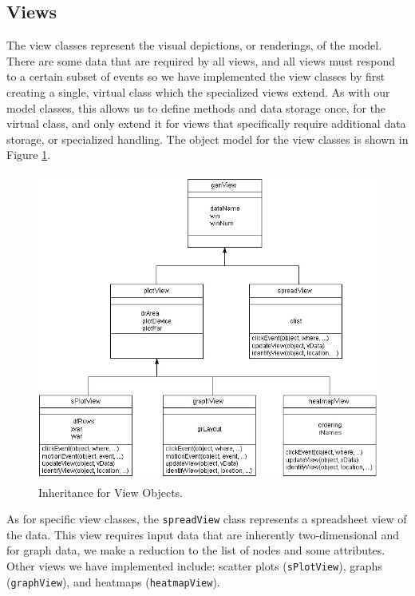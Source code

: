 \documentclass[11pt]{article}
\newcommand{\Rclass}[1]{\texttt{#1}}
\begin{document}
\subsection{Views}\label{Ssec:OneViews}

The view classes represent the visual depictions, or renderings, of
the model.  There are some data that are required by all views, and all views
must respond to a certain subset of events so we have implemented the view
classes by first creating a single, virtual class which the specialized
views extend.  As with our model classes, this allows us to define
methods and data storage once, for the virtual class, and only extend
it for views that specifically require additional data storage, or
specialized handling.  The object model for the view classes is shown
in Figure \ref{Fig:View}.

\begin{figure}[ht]
  \begin{center}
    \includegraphics[height=4in, width=5in]{newViewClass.jpg}
    \caption{ Inheritance for View Objects. }
    \label{Fig:View}
  \end{center}
\end{figure}

As for specific view classes, the \Rclass{spreadView} class represents
a spreadsheet view of the data.  This view requires input data that are
inherently two-dimensional and for graph data, we make a reduction to the 
list of nodes and some attributes.  Other views we have implemented 
include: scatter plots
(\Rclass{sPlotView}), graphs (\Rclass{graphView}), and heatmaps
(\Rclass{heatmapView}).
\end{document}
